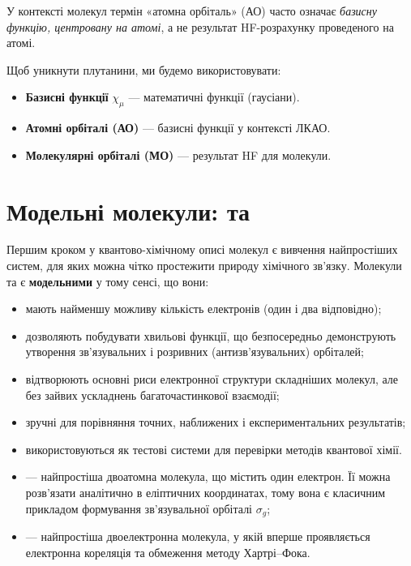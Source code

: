 \begin{commentbox}
	У контексті молекул термін «атомна орбіталь» (АО) часто означає \emph{базисну функцію, центровану на атомі}, а не результат HF-розрахунку проведеного на атомі.

	Щоб уникнути плутанини, ми будемо використовувати:
	\begin{itemize}
		\item \textbf{Базисні функції} $\chi_\mu$ --- математичні функції (гаусіани).
		\item \textbf{Атомні орбіталі (АО)} --- базисні функції у контексті ЛКАО.
		\item \textbf{Молекулярні орбіталі (МО)} --- результат HF для молекули.
	\end{itemize}
\end{commentbox}



\section{Модельні молекули:  та }

Першим кроком у квантово-хімічному описі молекул є вивчення найпростіших систем, для яких можна чітко простежити природу хімічного зв’язку.
Молекули  та  є \textbf{модельними} у тому сенсі, що вони:
\begin{itemize}
	\item мають найменшу можливу кількість електронів (один і два відповідно);
	\item дозволяють побудувати хвильові функції, що безпосередньо демонструють
	      утворення зв’язувальних і розривних (антизв’язувальних) орбіталей;
	\item відтворюють основні риси електронної структури складніших молекул,
	      але без зайвих ускладнень багаточастинкової взаємодії;
	\item зручні для порівняння точних, наближених і експериментальних результатів;
	\item використовуються як тестові системи для перевірки методів квантової хімії.
\end{itemize}

\begin{itemize}
	\item {} --- найпростіша двоатомна молекула, що містить один електрон.
	      Її можна розв’язати аналітично в еліптичних координатах,
	      тому вона є класичним прикладом формування зв’язувальної орбіталі $\sigma_g$;
	\item {} --- найпростіша двоелектронна молекула,
	      у якій вперше проявляється електронна кореляція
	      та обмеження методу Хартрі–Фока.
\end{itemize}


